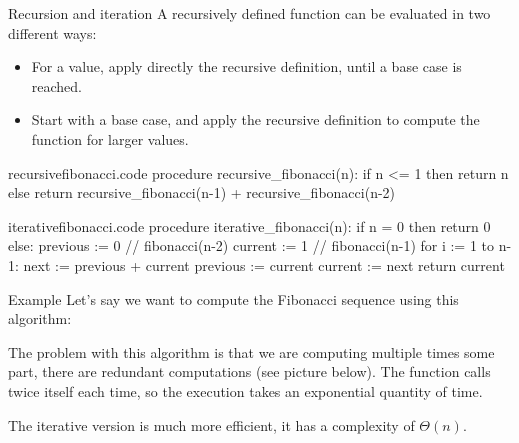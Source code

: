 \documentclass[a4paper]{article}
\begin{document}
\begin{parag}{Recursion and iteration}
    A recursively defined function can be evaluated in two different ways:
    \begin{itemize}
        \item {} For a value, apply directly the recursive definition, until a base case is reached. 
        \item {} Start with a base case, and apply the recursive definition to compute the function for larger values.
    \end{itemize} 
\end{parag}

\begin{filecontents*}[overwrite]{recursivefibonacci.code}
procedure recursive_fibonacci(n):
    if n <= 1 then return n
    else return recursive_fibonacci(n-1) + recursive_fibonacci(n-2)
\end{filecontents*}

\begin{filecontents*}[overwrite]{iterativefibonacci.code}
procedure iterative_fibonacci(n):
    if n = 0 then return 0
    else:
        previous := 0  // fibonacci(n-2)
        current := 1  // fibonacci(n-1)
        for i := 1 to n-1:
            next := previous + current
            previous := current
            current := next
        return current
\end{filecontents*}

\begin{parag}{Example}
    Let's say we want to compute the Fibonacci sequence using this algorithm:
    
    The problem with this algorithm is that we are computing multiple times some part, there are redundant computations (see picture below). The function calls twice itself each time, so the execution takes an exponential quantity of time. 

    The iterative version is much more efficient, it has a complexity of $\Theta\left(n\right)$.
    
\end{parag}
\end{document}

